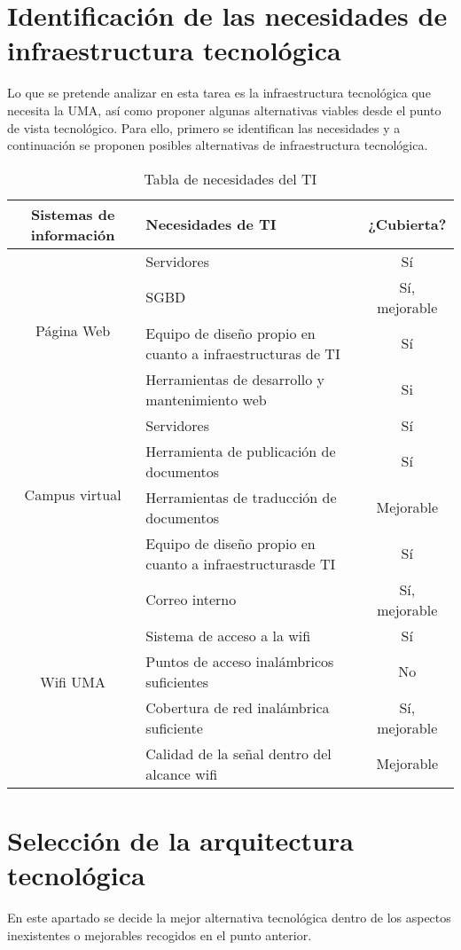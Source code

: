 \documentclass[11pt,a4paper,spanish,twoside]{book}
\begin{document}
\begin{itemize}
\section{Identificación de las necesidades de infraestructura tecnológica}
Lo que se pretende analizar en esta tarea es la infraestructura tecnológica
que necesita la UMA, así como proponer algunas alternativas viables desde
el punto de vista tecnológico. Para ello, primero se identifican las
necesidades y a continuación se proponen posibles alternativas de
infraestructura tecnológica. 

\begin{table}[!h]
\centering
  \begin{tabular}{clc}
    \textbf{Sistemas de información} & \textbf{Necesidades de TI} &
    \textbf{¿Cubierta?} \\ \hline 
    \hline \hline
     \multirow{4}{*}{Página Web}
     & Servidores & Sí \\
     & SGBD & Sí, mejorable \\
     & Equipo de diseño propio en cuanto a infraestructuras de TI & Sí\\
     & Herramientas de desarrollo y mantenimiento web & Si\\

     \multirow{4}{*}{Campus virtual}
     & Servidores & Sí\\
     & Herramienta de publicación de documentos & Sí\\
     & Herramientas de traducción de documentos & Mejorable\\
     & Equipo de diseño propio en cuanto a infraestructurasde TI & Sí\\
     & Correo interno & Sí, mejorable\\

     \multirow{3}{*}{Wifi UMA}
     & Sistema de acceso a la wifi & Sí\\
     & Puntos de acceso inalámbricos suficientes & No\\
     & Cobertura de red inalámbrica suficiente & Sí, mejorable\\
     & Calidad de la señal dentro del alcance wifi & Mejorable\\
          
  \end{tabular}
\caption{Tabla de necesidades del TI}
\end{table}

\section{Selección de la arquitectura tecnológica}
En este apartado se decide la mejor alternativa tecnológica
dentro de los aspectos inexistentes o mejorables recogidos en el punto
anterior.


\end{itemize}
\end{document}
